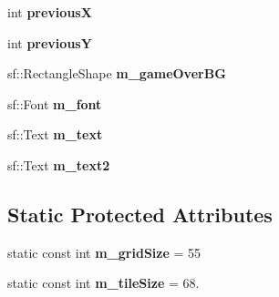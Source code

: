 \begin{DoxyCompactItemize}
int {\bfseries previousX}
\item 
\mbox{\label{class_game_a294902e2d41223bd5c81726473b75fb3}} 
int {\bfseries previousY}
\item 
\mbox{\label{class_game_af99854521f6825d3e5332c059235003d}} 
sf\+::\+Rectangle\+Shape {\bfseries m\+\_\+game\+Over\+BG}
\item 
\mbox{\label{class_game_af5c5c39d0eabe68c3bfff3509900a489}} 
sf\+::\+Font {\bfseries m\+\_\+font}
\item 
\mbox{\label{class_game_aa1a3ccd391299adad3ccb167ce3c1ee7}} 
sf\+::\+Text {\bfseries m\+\_\+text}
\item 
\mbox{\label{class_game_a6ad0e5cbb4f3d05ca6d346ae1c4fc0c3}} 
sf\+::\+Text {\bfseries m\+\_\+text2}
\end{DoxyCompactItemize}
\subsection*{Static Protected Attributes}
\begin{DoxyCompactItemize}
\item 
\mbox{\label{class_game_ae3b203dd7785eaff210e0e282bc2aae0}} 
static const int {\bfseries m\+\_\+grid\+Size} = 55
\item 
\mbox{\label{class_game_a09aee7951c9a15571f63c975b48710b3}} 
static const int {\bfseries m\+\_\+tile\+Size} = 68.
\end{DoxyCompactItemize}
